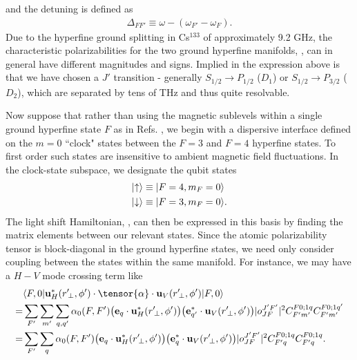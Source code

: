 \documentclass[preprint,aps,pra,onecolumn]{revtex4-1} %
\begin{document}
and the detuning is defined as
\begin{align}
	\Delta_{FF'} \equiv \omega - (\omega_{F'} - \omega_{F}).
\end{align}
Due to the hyperfine ground splitting in Cs$^{133}$ of approximately 9.2 GHz, the characteristic 
polarizabilities for the two ground hyperfine manifolds, , can in 
general have different magnitudes and signs.  Implied in the expression above is that we have chosen a 
$J'$ transition - generally $S_{1/2} \rightarrow P_{1/2}$ ($D_1$) or $S_{1/2} \rightarrow P_{3/2}$ ($D_2$), 
which are 
separated by tens of THz and thus quite resolvable.   

Now suppose that rather than using the magnetic sublevels within a single ground hyperfine state $F$ as 
in Refs. \cite{Deutsch2010a}, we begin with a dispersive interface defined on the $m=0$ ``clock" states 
between the $F=3$ and $F=4$ hyperfine states.  To first order such states are insensitive to ambient 
magnetic field fluctuations.  In the clock-state subspace, we designate the qubit states
\begin{align} 
	\lvert{\uparrow}\rangle &\equiv \lvert{F = 4,m_F = 0}\rangle \\
 	\lvert{\downarrow}\rangle &\equiv \lvert{F = 3,m_F=0}\rangle.
\end{align}
The light shift Hamiltonian, , can then be expressed in this basis by finding 
the 
matrix elements between our relevant states.  Since the atomic polarizability tensor is block-diagonal in 
the ground hyperfine states, we need only consider coupling between the states within the same 
manifold.  
For instance, we may have a $H-V$ mode crossing term like
\begin{align} \label{eq:ClockMatrixElement}
	&\bra{F,0} \mathbf{u}^*_H(r^\prime\!_\perp, \phi') \cdot \tensor{\alpha} \cdot 
	\mathbf{u}_{V}(r^\prime\!_\perp, \phi') \ket{F,0}\nonumber\\
  =& 
	\sum_{F'} \sum_{m'} \sum_{q, q'} \alpha_0(F,F') \big( \mathbf{e}_q \cdot 
	\mathbf{u}^*_H(r^\prime\!_\perp, \phi') \big) 
	\big( \mathbf{e}^*_{q'} \cdot \mathbf{u}_V(r^\prime\!_\perp, \phi') \big) |o^{J'F'}_{JF} |^2 C^{F 0;1 
	q}_{F' m'} C^{F 
	0;1q'}_{F' m'} \\
 = & \sum_{F'} \sum_{q} \alpha_0(F,F') \big( \mathbf{e}_q \cdot \mathbf{u}^*_H(r^\prime\!_\perp, \phi') 
	\big) \big( 
	\mathbf{e}^*_{q} \cdot \mathbf{u}_V(r^\prime\!_\perp, \phi') \big) |o^{J'F'}_{JF} |^2 C^{F 0;1q}_{F' q} 
	C^{F 0;1q}_{F' q}.
\end{align}
\end{document}
